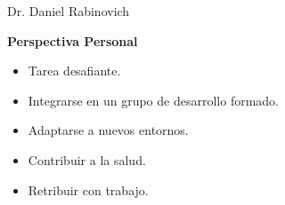 \begin{frame}
\begin{minipage}{3cm \textwidth}
\begin{block}{\small{Dr. Daniel Rabinovich}}
      \end{block}      
    \end{minipage}
    \begin{minipage}{6cm}
      \begin{center}
        \pause
        \textbf{Perspectiva Personal}
        \begin{itemize}
          \item Tarea desafiante.
          \item Integrarse en un grupo de desarrollo formado.
          \item Adaptarse a nuevos entornos.
          \item Contribuir a la salud.
          \item Retribuir con trabajo.
        \end{itemize}
      \end{center}
    \end{minipage}       
    
  \end{frame}